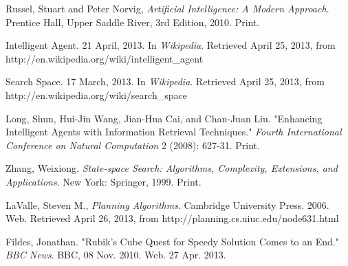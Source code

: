 \documentclass[a4paper,11pt]{report}
\begin{document}
\begin{thebibliography}{9}

    Russel, Stuart and Peter Norvig,
    \textit{Artificial Intelligence: A Modern Approach}.
    Prentice Hall, Upper Saddle River,
    3rd Edition,
    2010. Print.

    Intelligent Agent. 21 April, 2013.  
    In \textit{Wikipedia}.  Retrieved April 25, 2013,
    from http://en.wikipedia.org/wiki/intelligent\_agent
  
    Search Space. 17 March, 2013.  
    In \textit{Wikipedia}.  Retrieved April 25, 2013,
    from http://en.wikipedia.org/wiki/search\_space
  
    Long, Shun, Hui-Jin Wang, Jian-Hua Cai, and Chan-Juan Liu. 
    "Enhancing Intelligent Agents with Information Retrieval Techniques." 
    \textit{Fourth International Conference on Natural Computation} 2 
    (2008): 627-31. Print.

    Zhang, Weixiong. \textit{State-space Search: Algorithms, Complexity,
    Extensions, and Applications}. New York: Springer, 1999. Print.

    LaValle, Steven M., \textit{Planning Algorithms}.
    Cambridge University Press. 2006. Web.
    Retrieved April 26, 2013, from http://planning.cs.uiuc.edu/node631.html
 
    Fildes, Jonathan. "Rubik's Cube Quest for Speedy Solution Comes to an End."
    \textit{BBC News}. BBC, 08 Nov. 2010. Web. 27 Apr. 2013.

\end{thebibliography}
\end{document}
